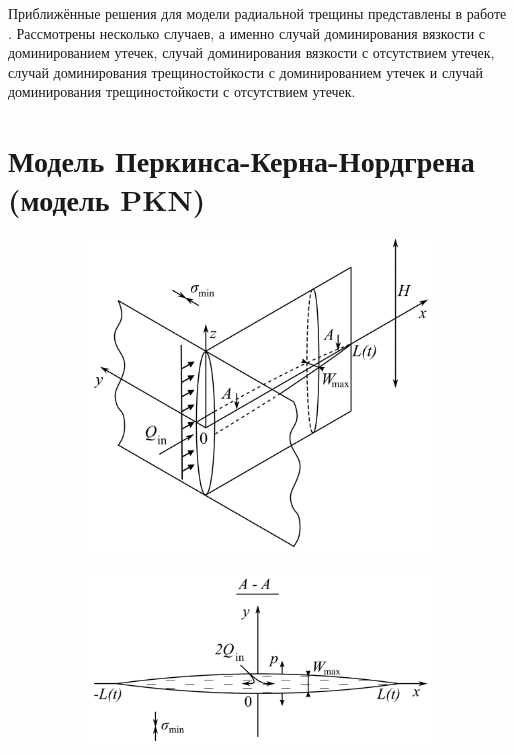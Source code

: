 Приближённые решения для модели радиальной трещины представлены в работе \cite{dontsov2}.
Рассмотрены несколько случаев, а именно случай доминирования вязкости с доминированием утечек, случай доминирования вязкости с отсутствием утечек, случай доминирования трещиностойкости с доминированием утечек и случай доминирования трещиностойкости с отсутствием утечек.

\section{Модель Перкинса-Керна-Нордгрена (модель PKN)}
\vspace*{-5mm}

\begin{figure}[H]
	\begin{subfigure}[t]{\dimexpr.5\linewidth-1.3em\relax}
		\centering
		\includegraphics[width=.95\linewidth,valign=t]{images/pkn_model_3D.jpg}
	\end{subfigure}
\hfill %
	\begin{subfigure}[t]{\dimexpr.5\linewidth-1.3em\relax}
		\centering
		\includegraphics[width=.95\linewidth,valign=t]{images/pkn_model_A-A_plane.jpg}

\end{subfigure}
\end{figure}
